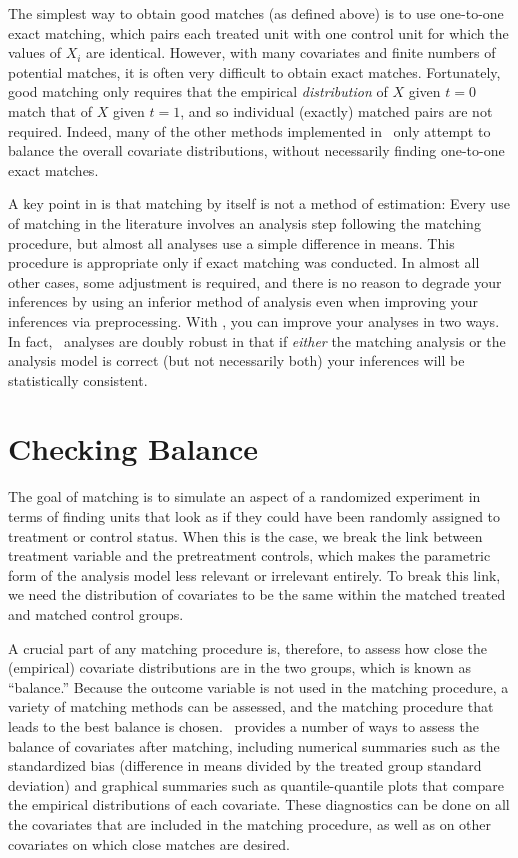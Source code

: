 The simplest way to obtain good matches (as defined above) is to use
one-to-one exact matching, which pairs each treated unit with one
control unit for which the values of $X_i$ are identical.  However,
with many covariates and finite numbers of potential matches, it is
often very difficult to obtain exact matches.  Fortunately, good
matching only requires that the empirical \emph{distribution} of $X$
given $t=0$ match that of $X$ given $t=1$, and so individual (exactly)
matched pairs are not required.  Indeed, many of the other methods
implemented in \MatchIt\ only attempt to balance the overall covariate
distributions, without necessarily finding one-to-one exact matches.

A key point in \citet*{HoImaKin05} is that matching by itself is not a
method of estimation: Every use of matching in the literature involves
an analysis step following the matching procedure, but almost all
analyses use a simple difference in means.  This procedure is
appropriate only if exact matching was conducted.  In almost all other
cases, some adjustment is required, and there is no reason to degrade
your inferences by using an inferior method of analysis even when
improving your inferences via preprocessing.  With \MatchIt, you can
improve your analyses in two ways.  In fact, \MatchIt\ analyses are
doubly robust in that if \emph{either} the matching analysis or the
analysis model is correct (but not necessarily both) your inferences
will be statistically consistent.

\section{Checking Balance}
\label{sec:balance-sum}

The goal of matching is to simulate an aspect of a randomized
experiment in terms of finding units that look as if they could have
been randomly assigned to treatment or control status.  When this is
the case, we break the link between treatment variable and the
pretreatment controls, which makes the parametric form of the analysis
model less relevant or irrelevant entirely.  To break this link, we
need the distribution of covariates to be the same within the matched
treated and matched control groups. 

A crucial part of any matching procedure is, therefore, to assess how
close the (empirical) covariate distributions are in the two groups,
which is known as ``balance.''  Because the outcome variable is not
used in the matching procedure, a variety of matching methods can be
assessed, and the matching procedure that leads to the best balance is
chosen.  \MatchIt\ provides a number of ways to assess the balance of
covariates after matching, including numerical summaries such as the
standardized bias (difference in means divided by the treated group
standard deviation) and graphical summaries such as quantile-quantile
plots that compare the empirical distributions of each covariate.
These diagnostics can be done on all the covariates that are included
in the matching procedure, as well as on other covariates on which
close matches are desired.

